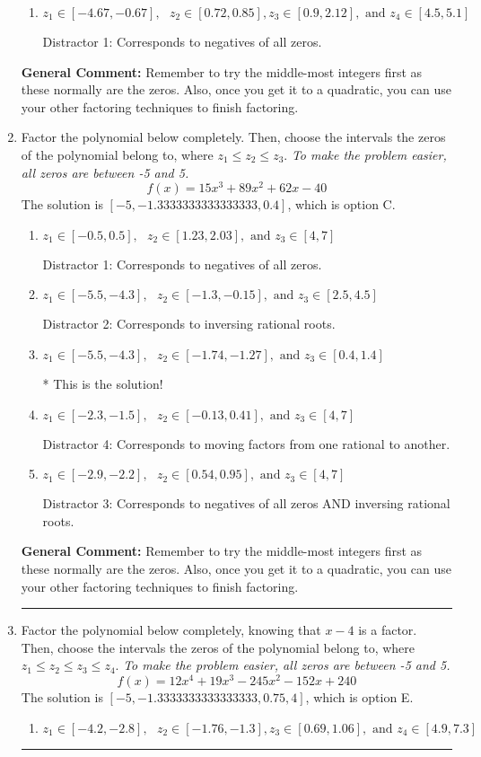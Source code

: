 \documentclass{extbook}[14pt]
\newcommand{\litem}[1]{\item #1

\rule{\textwidth}{0.4pt}}
\begin{document}
\begin{enumerate}
{\begin{enumerate}[label=\Alph*.]
* This is the solution!
\item \( z_1 \in [-4.67, -0.67], \text{   }  z_2 \in [0.72, 0.85], z_3 \in [0.9, 2.12], \text{   and   } z_4 \in [4.5, 5.1] \)

 Distractor 1: Corresponds to negatives of all zeros.
\end{enumerate}

\textbf{General Comment:} Remember to try the middle-most integers first as these normally are the zeros. Also, once you get it to a quadratic, you can use your other factoring techniques to finish factoring.
}
\litem{
Factor the polynomial below completely. Then, choose the intervals the zeros of the polynomial belong to, where $z_1 \leq z_2 \leq z_3$. \textit{To make the problem easier, all zeros are between -5 and 5.}
\[ f(x) = 15x^{3} +89 x^{2} +62 x -40 \]The solution is \( [-5, -1.3333333333333333, 0.4] \), which is option C.\begin{enumerate}[label=\Alph*.]
\item \( z_1 \in [-0.5, 0.5], \text{   }  z_2 \in [1.23, 2.03], \text{   and   } z_3 \in [4, 7] \)

 Distractor 1: Corresponds to negatives of all zeros.
\item \( z_1 \in [-5.5, -4.3], \text{   }  z_2 \in [-1.3, -0.15], \text{   and   } z_3 \in [2.5, 4.5] \)

 Distractor 2: Corresponds to inversing rational roots.
\item \( z_1 \in [-5.5, -4.3], \text{   }  z_2 \in [-1.74, -1.27], \text{   and   } z_3 \in [0.4, 1.4] \)

* This is the solution!
\item \( z_1 \in [-2.3, -1.5], \text{   }  z_2 \in [-0.13, 0.41], \text{   and   } z_3 \in [4, 7] \)

 Distractor 4: Corresponds to moving factors from one rational to another.
\item \( z_1 \in [-2.9, -2.2], \text{   }  z_2 \in [0.54, 0.95], \text{   and   } z_3 \in [4, 7] \)

 Distractor 3: Corresponds to negatives of all zeros AND inversing rational roots.
\end{enumerate}

\textbf{General Comment:} Remember to try the middle-most integers first as these normally are the zeros. Also, once you get it to a quadratic, you can use your other factoring techniques to finish factoring.
}
\litem{
Factor the polynomial below completely, knowing that $x-4$ is a factor. Then, choose the intervals the zeros of the polynomial belong to, where $z_1 \leq z_2 \leq z_3 \leq z_4$. \textit{To make the problem easier, all zeros are between -5 and 5.}
\[ f(x) = 12x^{4} +19 x^{3} -245 x^{2} -152 x + 240 \]The solution is \( [-5, -1.3333333333333333, 0.75, 4] \), which is option E.\begin{enumerate}[label=\Alph*.]
\item \( z_1 \in [-4.2, -2.8], \text{   }  z_2 \in [-1.76, -1.3], z_3 \in [0.69, 1.06], \text{   and   } z_4 \in [4.9, 7.3] \)


\end{enumerate}}
\end{enumerate}
\end{document}
